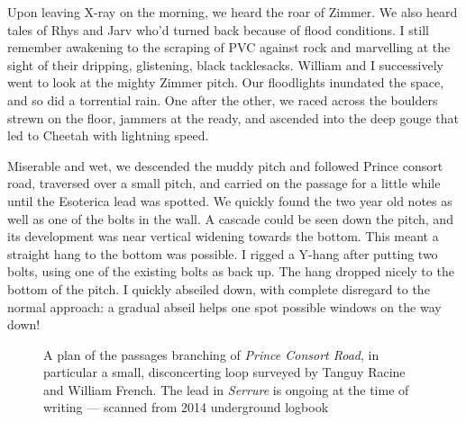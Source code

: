 \begin{marginfigure}
\end{marginfigure}

Upon leaving X-ray on the morning, we heard the roar of Zimmer. We also heard tales of Rhys and Jarv who'd turned back because of flood conditions. I still remember awakening to the scraping of PVC against rock and marvelling at  the sight of their dripping, glistening, black tacklesacks. William and I successively went to look at the mighty Zimmer pitch. Our floodlights inundated the space, and so did a torrential rain. One after the other, we raced across the boulders strewn on the floor, jammers at the ready, and ascended into the deep gouge that led to Cheetah with lightning speed.

Miserable and wet, we descended the muddy pitch and followed Prince consort road, traversed over a small pitch, and carried on the passage for a little while until the Esoterica lead was spotted. We quickly found the two year old notes as well as one of the bolts in the wall. A cascade could be seen down the pitch, and its development was near vertical widening towards the bottom. This meant a straight hang to the bottom was possible. I rigged a Y-hang after putting two bolts, using one of the existing bolts as back up. The hang dropped nicely to the bottom of the pitch. I quickly abseiled down, with complete disregard to the normal approach: a gradual abseil helps one spot possible windows on the way down! 

\begin{figure}[t]
	\checkoddpage \ifoddpage \forcerectofloat \else \forceversofloat \fi
    		\centering
    
   		\caption{A plan of the passages branching of \emph{Prince Consort Road}, in particular a small, disconcerting loop surveyed by Tanguy Racine and William French. The lead in \emph{Serrure} is ongoing at the time of writing
    		 --- scanned from 2014 underground logbook}
		 \label{scan}
\end{figure}

